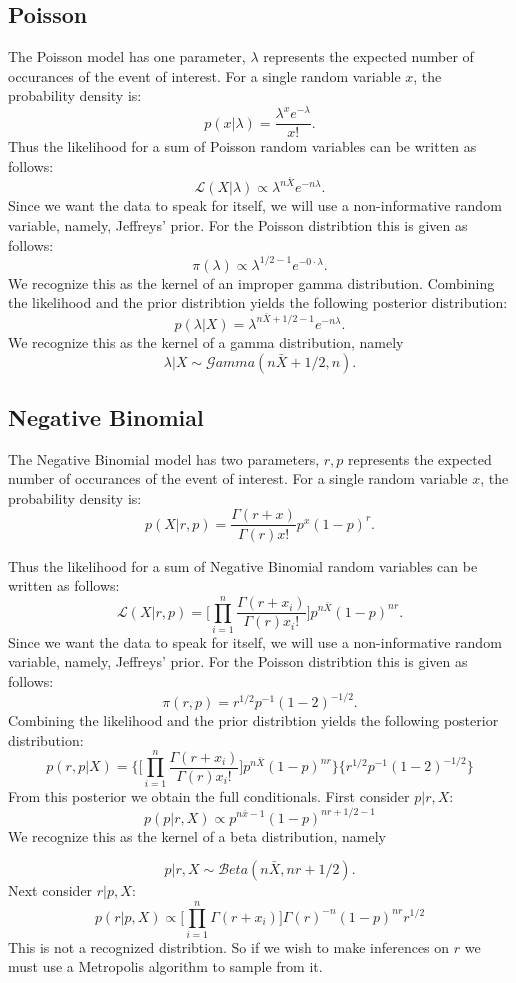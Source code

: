 \documentclass{article}
\begin{document}
\subsection{Poisson}
\label{ss:mPoisson}
The Poisson model has one parameter, $\lambda$ represents the expected number of occurances of the event of interest. For a single random variable $x$, the probability density is:
$$p(x|\lambda)=\frac{\lambda^xe^{-\lambda}}{x!}.$$
Thus the likelihood for a sum of Poisson random variables can be written as follows:
$$\mathcal{L}(X|\lambda)\propto\lambda^{n\bar{X}}e^{-n\lambda}.$$ 
Since we want the data to speak for itself, we will use a non-informative random variable, namely, Jeffreys' prior. For the Poisson distribtion this is given as follows:
$$\pi(\lambda)\propto\lambda^{1/2-1}e^{-0\cdot\lambda}.$$
We recognize this as the kernel of an improper gamma distribution. Combining the likelihood and the prior distribtion yields the following posterior distribution:
$$p(\lambda|X)=\lambda^{n\bar{X}+1/2-1}e^{-n\lambda}.$$
We recognize this as the kernel of a gamma distribution, namely
$$\lambda|X\sim\mathcal{G}amma(n\bar{X}+1/2,n).$$

\subsection{Negative Binomial}
\label{ss:mNBinom}
The Negative Binomial model has two parameters, $r,p$ represents the expected number of occurances of the event of interest. For a single random variable $x$, the probability density is:
$$p(X|r,p)=\frac{\Gamma(r+x)}{\Gamma(r)x!}p^{x}(1-p)^{r}.$$

Thus the likelihood for a sum of Negative Binomial random variables can be written as follows:
$$\mathcal{L}(X|r,p)=\Bigg[\prod_{i=1}^n\frac{\Gamma(r+x_i)}{\Gamma(r)x_i!}\Bigg]p^{n\bar{X}}(1-p)^{nr}.$$
Since we want the data to speak for itself, we will use a non-informative random variable, namely, Jeffreys' prior. For the Poisson distribtion this is given as follows:
$$\pi(r,p)=r^{1/2}p^{-1}(1-2)^{-1/2}.$$
Combining the likelihood and the prior distribtion yields the following posterior distribution:
$$p(r,p|X)=\Bigg\{\Bigg[\prod_{i=1}^n\frac{\Gamma(r+x_i)}{\Gamma(r)x_i!}\Bigg]p^{n\bar{X}}(1-p)^{nr}\Bigg\}\Bigg\{r^{1/2}p^{-1}(1-2)^{-1/2}\Bigg\}$$
From this posterior we obtain the full conditionals. First consider $p|r,X$:
$$p(p|r,X)\propto p^{n\bar{x}-1}(1-p)^{nr+1/2-1}$$
We recognize this as the kernel of a beta distribution, namely

$$p|r,X\sim\mathcal{B}eta(n\bar{X},nr+1/2).$$
Next consider $r|p,X$:
$$p(r|p,X)\propto\bigg[\prod_{i=1}^n\Gamma(r+x_i)\bigg]\Gamma(r)^{-n}(1-p)^{nr}r^{1/2}$$
This is not a recognized distribtion. So if we wish to make inferences on $r$ we must use a Metropolis algorithm to sample from it.
\end{document}
